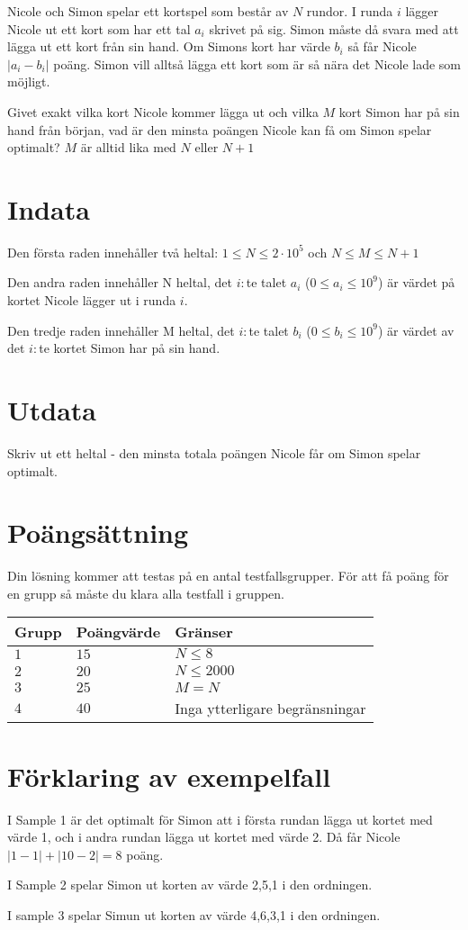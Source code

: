 Nicole och Simon spelar ett kortspel som består av $N$ rundor. I runda $i$ lägger Nicole ut ett kort som har ett tal $a_i$ skrivet på sig. Simon måste då svara med att lägga ut ett kort från sin hand. Om Simons kort har värde $b_i$ så får Nicole $|a_i-b_i|$ poäng. Simon vill alltså lägga ett kort som är så nära det Nicole lade som möjligt.

Givet exakt vilka kort Nicole kommer lägga ut och vilka $M$ kort Simon har på sin hand från början, vad är den minsta poängen Nicole kan få om Simon spelar optimalt? $M$ är alltid lika med $N$ eller $N+1$

\section*{Indata}
Den första raden innehåller två heltal: $1\leq N \leq 2 \cdot 10^5$ och $N\leq M \leq N+1$

Den andra raden innehåller N heltal, det $i:$te talet $a_i$ ($0\le a_i \le 10^9$) är värdet på kortet Nicole lägger ut i runda $i$.

Den tredje raden innehåller M heltal, det $i:$te talet $b_i$ ($0\le b_i \le 10^9$) är värdet av det $i:$te kortet Simon har på sin hand.

\section*{Utdata}
Skriv ut ett heltal - den minsta totala poängen Nicole får om Simon spelar optimalt.

\section*{Poängsättning}
Din lösning kommer att testas på en antal testfallsgrupper.
För att få poäng för en grupp så måste du klara alla testfall i gruppen.

\noindent
\begin{tabular}{| l | l | p{12cm} |}
  \hline
  Grupp & Poängvärde & Gränser \\ \hline
  $1$   & $15$       & $N \leq 8 $\\ \hline
  $2$   & $20$       & $N \leq 2000 $  \\ \hline
  $3$   & $25$       & $M=N$ \\ \hline
  $4$   & $40$       & Inga ytterligare begränsningar \\ \hline
\end{tabular}

\section*{Förklaring av exempelfall}
I Sample 1 är det optimalt för Simon att i första rundan lägga ut kortet med värde 1, och i andra rundan lägga ut kortet med värde 2. Då får Nicole $|1-1| + |10-2|=8$ poäng.

I Sample 2 spelar Simon ut korten av värde 2,5,1 i den ordningen.

I sample 3 spelar Simun ut korten av värde 4,6,3,1 i den ordningen.